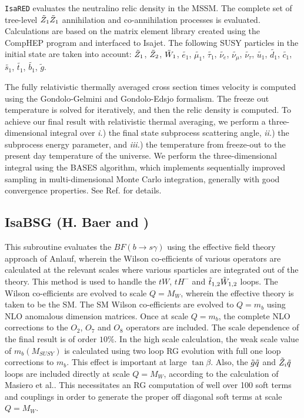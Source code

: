 \verb|IsaRED| evaluates the neutralino relic density in the MSSM.  The
complete set of tree-level $\tilde Z_1\tilde Z_1$ annihilation and co-annihilation
processes is evaluated. Calculations are based on the matrix element
library created using the CompHEP program and interfaced to Isajet. The
following SUSY particles in the initial state are taken into account:
$\tilde Z_1$, $\tilde Z_2$, $\tilde W_1$, $\tilde{e_1}$, $\tilde{\mu_1}$,
$\tilde{\tau_1}$, $\tilde{\nu_e}$, $
\tilde{\nu_\mu}$, $\tilde{\nu_\tau}$, $\tilde{u_1}$, $\tilde{d_1}$, $
\tilde{c_1}$, $\tilde{s_1}$, $ \tilde{t_1}$, $\tilde{b_1}$, $\tilde{g}$.

The fully relativistic thermally averaged cross section times velocity
is computed using the Gondolo-Gelmini\cite{gg} and
Gondolo-Edsjo\cite{ge} formalism.  The freeze out temperature is solved
for iteratively, and then the relic density is computed.  To achieve our
final result with relativistic thermal averaging, we perform a
three-dimensional integral over {\it i.}) the final state subprocess
scattering angle, {\it ii.}) the subprocess energy parameter, and {\it
iii.}) the temperature from freeze-out to the present day temperature of
the universe.  We perform the three-dimensional integral using the BASES
algorithm\cite{bases}, which implements sequentially improved sampling
in multi-dimensional Monte Carlo integration, generally with good
convergence properties.  See Ref. \cite{bb1,bbb} for details.

\subsection{IsaBSG (H. Baer and )} 

This subroutine evaluates the $BF(b\to s\gamma)$ using the effective
field theory approach of Anlauf\cite{anlauf}, wherein the Wilson
co-efficients of various operators are calculated at the relevant scales
where various sparticles are integrated out of the theory.  This method
is used to handle the $tW$, $tH^-$ and $\tilde t_{1,2}\tilde W_{1,2}$ loops.  The
Wilson co-efficients are evolved to scale $Q=M_W$, wherein the effective
theory is taken to be the SM.  The SM Wilson co-efficients are evolved
to $Q=m_b$ using NLO anomalous dimension matrices. Once at scale
$Q=m_b$, the complete NLO corrections to the $O_2$, $O_7$ and $O_8$
operators are included\cite{greub}.  The scale dependence of the final
result is of order $10\%$.  In the high scale calculation, the weak
scale value of $m_b(M_{SUSY})$ is calculated using two loop RG evolution
with full one loop corrections to $m_b$. This effect is important at
large $\tan\beta$. Also, the $\tilde g\tilde q$ and $\tilde Z_i\tilde q$ loops are included
directly at scale $Q=M_W$, according to the calculation of Masiero et
al.\cite{masiero}.  This necessitates an RG computation of well over 100
soft terms and couplings in order to generate the proper off diagonal
soft terms at scale $Q=M_W$.

